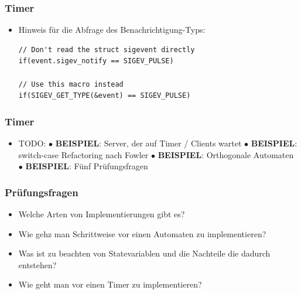 \documentclass{beamer}
\begin{document}
\begin{frame}[fragile]
 \frametitle{Timer}
 \begin{itemize}
  \item Hinweis f\"ur die Abfrage des Benachrichtigung-Typs:\newline
  \begin{lstlisting}
// Don't read the struct sigevent directly
if(event.sigev_notify == SIGEV_PULSE)

// Use this macro instead
if(SIGEV_GET_TYPE(&event) == SIGEV_PULSE)
  \end{lstlisting}
 \end{itemize}
\end{frame}

\begin{frame}[fragile]
 \frametitle{Timer}
 \begin{itemize}
  \item TODO:\newline\newline
  $\bullet$ \textbf{BEISPIEL}: Server, der auf Timer / Clients wartet\newline\newline
  $\bullet$ \textbf{BEISPIEL}: switch-case Refactoring nach Fowler\newline\newline
  $\bullet$ \textbf{BEISPIEL}: Orthogonale Automaten\newline\newline
  $\bullet$ \textbf{BEISPIEL}: F\"unf Pr\"ufungsfragen
 \end{itemize}
\end{frame}

\begin{frame}
 \frametitle{Pr\"ufungsfragen}
 \begin{itemize}
  \item Welche Arten von Implementierungen gibt es?
  \item Wie gehz man Schrittweise vor einen Automaten zu implementieren?
  \item Was ist zu beachten von Statevariablen und die Nachteile die dadurch entstehen?
  \item Wie geht man vor einen Timer zu implementieren?
 \end{itemize}
\end{frame}
\end{document}
